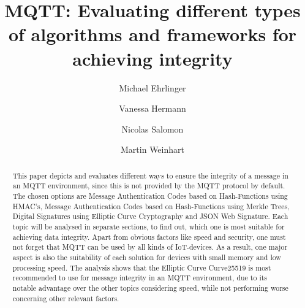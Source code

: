 \documentclass[runningheads]{llncs}
\begin{document}
\title{MQTT: Evaluating different types of algorithms and frameworks for achieving integrity}


\author{Michael Ehrlinger \and Vanessa Hermann \and Nicolas Salomon \and Martin Weinhart}



\maketitle


\begin{abstract}
This paper depicts and evaluates different ways to ensure the integrity of a message in an MQTT environment, since this is not provided by the MQTT protocol by default. The chosen options are Message Authentication Codes based on Hash-Functions using HMAC's, Message Authentication Codes based on Hash-Functions using Merkle Trees, Digital Signatures using Elliptic Curve Cryptography and JSON Web Signature. Each topic will be analysed in separate sections, to find out, which one is most suitable for achieving data integrity. Apart from obvious factors like speed and security, one must not forget that MQTT can be used by all kinds of IoT-devices. As a result, one major aspect is also the suitability of each solution for devices with small memory and low processing speed. The analysis shows that the Elliptic Curve Curve25519 is most recommended to use for message integrity in an MQTT environment, due to its notable advantage over the other topics considering speed, while not performing worse concerning other relevant factors.
\newline

\end{abstract}



\newpage







%
%
\newpage



\end{document}

